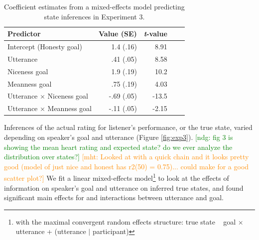 \documentclass[10pt,letterpaper]{article}
\newcommand{\ndg}[1]{\textcolor{Green}{[ndg: #1]}}
\newcommand{\mht}[1]{\textcolor{DarkOrange}{[mht: #1]}}
\begin{document}
\begin{table}[t]
\caption{\label{tab:lmer2}  Coefficient estimates from a mixed-effects model predicting state inferences in Experiment 3.} 
\begin{center} 
\begin{tabular}{l r r r l} 
\hline
Predictor  &  Value (SE) & \emph{t}-value\\
\hline
Intercept (Honesty goal)  & 1.4 (.16) & 8.91 \\
Utterance & .41 (.05) &  8.58 \\
Niceness goal  & 1.9 (.19) & 10.2 \\
Meanness goal & .75 (.19) & 4.03 \\
Utterance $\times$ Niceness goal & -.69 (.05) & -13.5 \\
Utterance $\times$ Meanness goal & -.11 (.05) & -2.15 \\
\hline
\end{tabular} 
\end{center} 
\end{table}

Inferences of the actual rating for listener's performance, or the true state, varied depending on speaker's goal and utterance (Figure \ref{fig:exp3}).
\ndg{fig 3 is showing the mean heart rating and expected state? do we ever analyze the distribution over states?}
\mht{Looked at with a quick chain and it looks pretty good (model of just nice and honest has r2(50) = 0.75)... could make for a good scatter plot?}
We fit a linear mixed-effects model\footnote{with the maximal convergent random effects structure: true state ~ goal $\times$ utterance + (utterance $|$ participant)} to look at the effects of information on speaker's goal and utterance on inferred true states, and found significant main effects for and interactions between utterance and goal. 
\end{document}
